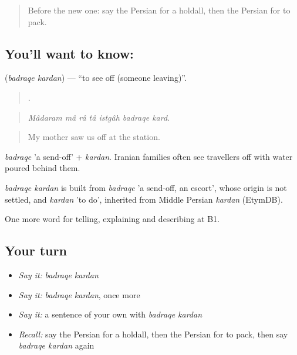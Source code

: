 \label{lesson:FA-C433-badraqe-kardan}



\begin{quote}
Before the new one: say the Persian for a holdall, then the Persian for to pack.
\end{quote}

\subsection*{You'll want to know:  }
\textbf{ } (\emph{badraqe kardan}) — \textquotedblleft{}to see off (someone leaving)\textquotedblright{}.

\begin{quote}
      .
\end{quote}

\begin{quote}
\emph{Mâdaram mâ râ tâ istgâh badraqe kard.}
\end{quote}

\begin{quote}
My mother saw us off at the station.
\end{quote}

\emph{badraqe} 'a send-off' + \emph{kardan}. Iranian families often see travellers off with water poured behind them.

\begin{cousinweb}
\emph{badraqe kardan} is built from \emph{badraqe} 'a send-off, an escort', whose origin is not settled, and \emph{kardan} 'to do', inherited from Middle Persian \emph{kardan} (EtymDB).
\end{cousinweb}

\begin{grammarlens}[title={What you've built}]
One more word for telling, explaining and describing at B1.
\end{grammarlens}

\subsection*{Your turn}
\begin{itemize}
\raggedright
  \item \emph{Say it:} \emph{badraqe kardan}
  \item \emph{Say it:} \emph{badraqe kardan}, once more
  \item \emph{Say it:} a sentence of your own with \emph{badraqe kardan}
  \item \emph{Recall:} say the Persian for a holdall, then the Persian for to pack, then say \emph{badraqe kardan} again
\end{itemize}

